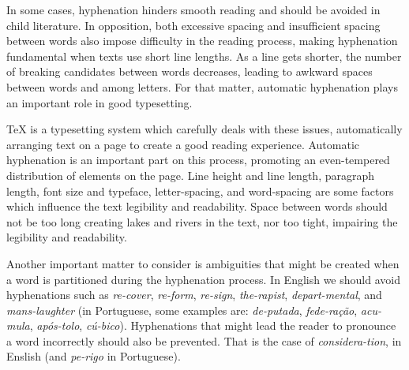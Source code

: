\documentclass{article}
\begin{document}
In some cases, hyphenation hinders smooth reading and should be avoided in
child literature. In opposition, both excessive spacing and insufficient
spacing between words also impose difficulty in the reading process, making
hyphenation fundamental when texts use short line lengths. As a line gets
shorter, the number of breaking candidates between words decreases, leading to
awkward spaces between words and among letters. For that matter, automatic
hyphenation plays an important role in good typesetting.


\TeX{} is a typesetting system which carefully deals with these issues,
automatically arranging text on a page to create a good reading experience.
Automatic hyphenation is an important part on this process,
promoting an even-tempered distribution of elements on the page.
Line height and line length, paragraph length, font size and typeface,
letter-spacing, and word-spacing are some factors which influence the text legibility
and readability. Space between words should not be too long creating lakes and
rivers in the text, nor too tight, impairing the legibility and readability.

Another important matter to consider is ambiguities that might be created when
a word is partitioned during the hyphenation process. In English we should
avoid hyphenations such as \emph{re-cover}, \emph{re-form}, \emph{re-sign}, \emph{the-rapist},
\emph{depart-mental}, and \emph{mans-laughter} (in Portuguese, some examples are:
\emph{de-putada}, \emph{fede-ração}, \emph{acu-mula}, \emph{após-tolo},
\emph{cú-bico}). Hyphenations that might lead the reader to pronounce a word
incorrectly should also be prevented. That is the case of
\emph{considera-tion}, in Enslish (and \emph{pe-rigo} in Portuguese).
\end{document}
